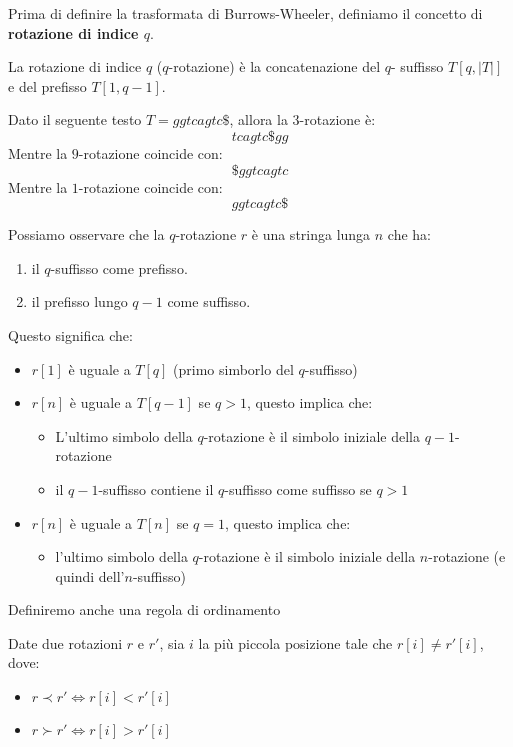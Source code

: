 Prima di definire la trasformata di Burrows-Wheeler, definiamo il concetto di
\textbf{rotazione di indice $q$}.
\begin{definizione}
    La rotazione di indice $q$ ($q$-rotazione) è la concatenazione
    del $q$- suffisso $T[q,|T|]$ e del prefisso $T[1,q-1]$.
\end{definizione}
\begin{esempio}
    Dato il seguente testo $T=ggtcagtc\$$, allora la $3$-rotazione è:
    $$tcagtc\$gg$$
        Mentre la $9$-rotazione coincide con:
    $$\$ggtcagtc$$
        Mentre la $1$-rotazione coincide con:
    $$ggtcagtc\$$$
\end{esempio}
Possiamo osservare che la $q$-rotazione $r$ è una stringa lunga $n$ che ha:
\begin{enumerate}
    \item il $q$-suffisso come prefisso.
    \item il prefisso lungo $q-1$ come suffisso.
\end{enumerate}
Questo significa che:
\begin{itemize}
    \item $r[1]$ è uguale a $T[q]$ (primo simborlo del $q$-suffisso)
    \item $r[n]$ è uguale a $T[q-1]$ se $q>1$, questo implica che:
          \begin{itemize}
              \item L'ultimo simbolo della $q$-rotazione è il simbolo iniziale
                    della $q-1$-rotazione
              \item il $q-1$-suffisso contiene il $q$-suffisso come suffisso se
                    $q>1$
          \end{itemize}
    \item $r[n]$ è uguale a $T[n]$ se $q=1$, questo implica che:
          \begin{itemize}
              \item l'ultimo simbolo della $q$-rotazione è il simbolo iniziale
                    della $n$-rotazione (e quindi dell'$n$-suffisso)
          \end{itemize}
\end{itemize}
Definiremo anche una regola di ordinamento
\begin{definizione}
    Date due rotazioni $r$ e $r'$, sia $i$ la più piccola posizione tale che
    $r[i]\ne r'[i]$, dove:
    \begin{itemize}
        \item $r \prec r'\iff r[i] < r'[i]$
        \item $r \succ r'\iff r[i] > r'[i]$
    \end{itemize}
\end{definizione}
